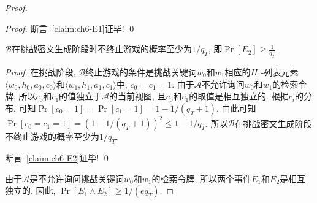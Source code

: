 \begin{proof}
\begin{proof}
断言~\ref{claim:ch6-E1}证毕! \qed  
\end{proof}

\begin{claim}\label{claim:ch6-E2}
$\mathcal{B}$在挑战密文生成阶段时不终止游戏的概率至少为$1/q_T$, 即$\Pr[E_2] \geq \frac{1}{q_T}$. 
\end{claim}
\begin{proof}
在挑战阶段, $\mathcal{B}$终止游戏的条件是挑战关键词$w_0$和$w_1$相应的$H_1$-列表元素$\langle w_0, h_0, a_0, c_0\rangle$和$\langle w_1, h_1, a_1, c_1\rangle$中, $c_0 = c_1 = 1$. 由于$\mathcal{A}$不允许询问$w_0$和$w_1$的检索令牌, 所以$c_0$和$c_1$的值独立于$\mathcal{A}$的当前视图, 且$c_0$和$c_1$的取值是相互独立的. 根据$c_i$的分布, 可知$\Pr[c_0 = 1] = \Pr[c_1 = 1] = 1 - 1/(q_T + 1)$, 由此可知$\Pr[c_0 = c_1 = 1] = (1 - 1/(q_T + 1))^2 \leq 1 - 1/q_T$. 所以$\mathcal{B}$在挑战密文生成阶段不终止游戏的概率至少为$1/q_T$. 

断言~\ref{claim:ch6-E2}证毕! \qed  
\end{proof}

由于$\mathcal{A}$是不允许询问挑战关键词$w_0$和$w_1$的检索令牌, 所以两个事件$E_1$和$E_2$是相互独立的. 因此, $\Pr[E_1 \land E_2] \geq 1/(eq_T)$.  


\end{proof}
